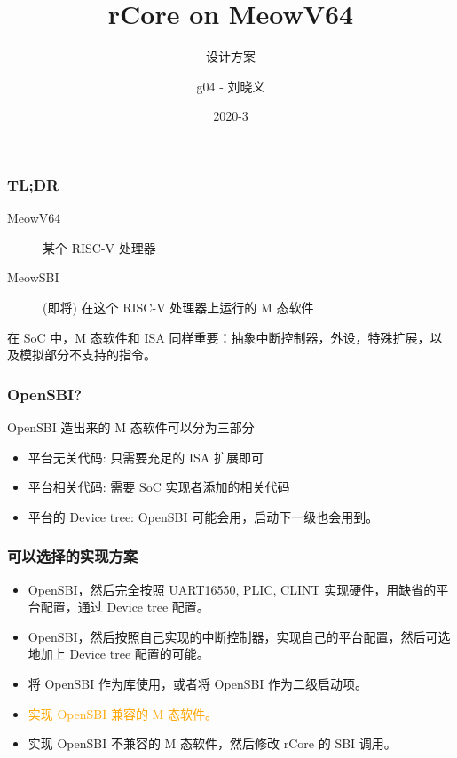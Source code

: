 \documentclass[UTF-8]{ctexbeamer}
\title{rCore on MeowV64}
\subtitle{设计方案}
\author{g04 - 刘晓义}
\date{2020-3}
\begin{document}
\begin{frame}
  \titlepage
\end{frame}

\begin{frame}
  \frametitle{TL;DR}

  \begin{description}
    \item[MeowV64] 某个 RISC-V 处理器
    \item[MeowSBI] (即将) 在这个 RISC-V 处理器上运行的 M 态软件
  \end{description}

  \vspace{1em}

  在 SoC 中，M 态软件和 ISA 同样重要：抽象中断控制器，外设，特殊扩展，以及模拟部分不支持的指令。
\end{frame}

\begin{frame}
  \frametitle{OpenSBI?}

  OpenSBI 造出来的 M 态软件可以分为三部分
  \begin{itemize}
    \item 平台无关代码: 只需要充足的 ISA 扩展即可
    \item 平台相关代码: 需要 SoC 实现者添加的相关代码
    \item 平台的 Device tree: OpenSBI 可能会用，启动下一级也会用到。
  \end{itemize}
\end{frame}
\begin{frame}
  \frametitle{可以选择的实现方案}

  \begin{itemize}
    \item OpenSBI，然后完全按照 UART16550, PLIC, CLINT 实现硬件，用缺省的平台配置，通过 Device tree 配置。
    \item OpenSBI，然后按照自己实现的中断控制器，实现自己的平台配置，然后可选地加上 Device tree 配置的可能。
    \item 将 OpenSBI 作为库使用，或者将 OpenSBI 作为二级启动项。
    \item \textcolor<2>{orange}{实现 OpenSBI 兼容的 M 态软件。}
    \item 实现 OpenSBI 不兼容的 M 态软件，然后修改 rCore 的 SBI 调用。 
  \end{itemize}
\end{frame}
\end{document}
